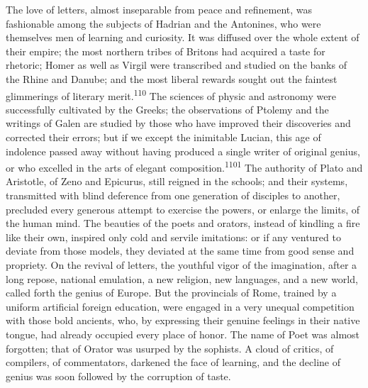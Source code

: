 The love of letters, almost inseparable from peace and
refinement, was fashionable among the subjects of Hadrian and the
Antonines, who were themselves men of learning and curiosity. It
was diffused over the whole extent of their empire; the most
northern tribes of Britons had acquired a taste for rhetoric;
Homer as well as Virgil were transcribed and studied on the banks
of the Rhine and Danube; and the most liberal rewards sought out
the faintest glimmerings of literary merit.\textsuperscript{110} The sciences of
physic and astronomy were successfully cultivated by the Greeks;
the observations of Ptolemy and the writings of Galen are studied
by those who have improved their discoveries and corrected their
errors; but if we except the inimitable Lucian, this age of
indolence passed away without having produced a single writer of
original genius, or who excelled in the arts of elegant
composition.\textsuperscript{1101} The authority of Plato and Aristotle, of Zeno
and Epicurus, still reigned in the schools; and their systems,
transmitted with blind deference from one generation of disciples
to another, precluded every generous attempt to exercise the
powers, or enlarge the limits, of the human mind. The beauties of
the poets and orators, instead of kindling a fire like their own,
inspired only cold and servile imitations: or if any ventured to
deviate from those models, they deviated at the same time from
good sense and propriety. On the revival of letters, the youthful
vigor of the imagination, after a long repose, national
emulation, a new religion, new languages, and a new world, called
forth the genius of Europe. But the provincials of Rome, trained
by a uniform artificial foreign education, were engaged in a very
unequal competition with those bold ancients, who, by expressing
their genuine feelings in their native tongue, had already
occupied every place of honor. The name of Poet was almost
forgotten; that of Orator was usurped by the sophists. A cloud of
critics, of compilers, of commentators, darkened the face of
learning, and the decline of genius was soon followed by the
corruption of taste.


